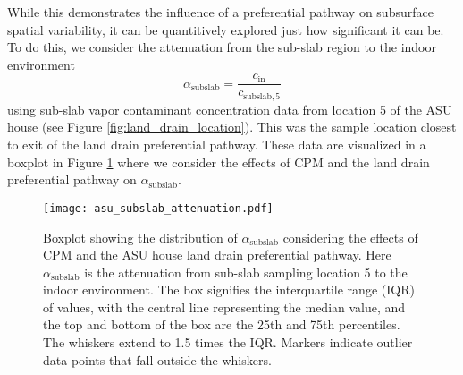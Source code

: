 While this demonstrates the influence of a preferential pathway on subsurface spatial variability, it can be quantitively explored just how significant it can be.
To do this, we consider the attenuation from the sub-slab region to the indoor environment
\begin{equation}
  \alpha_\mathrm{subslab} = \frac{c_\mathrm{in}}{c_\mathrm{subslab,5}}
\end{equation}
using sub-slab vapor contaminant concentration data from location 5 of the ASU house (see Figure \ref{fig:land_drain_location}).
This was the sample location closest to exit of the land drain preferential pathway.
These data are visualized in a boxplot in Figure \ref{fig:asu_subslab_attenuation} where we consider the effects of CPM and the land drain preferential pathway on $\alpha_\mathrm{subslab}$.\par

\begin{figure}[htb!]
  \centering
  \texttt{[image: asu\_subslab\_attenuation.pdf]}
  \caption[Boxplot showing the distribution of $\alpha_\mathrm{subslab}$ considering the effects of CPM and the ASU house land drain preferential pathway.]{Boxplot showing the distribution of $\alpha_\mathrm{subslab}$ considering the effects of CPM and the ASU house land drain preferential pathway. Here $\alpha_\mathrm{subslab}$ is the attenuation from sub-slab sampling location 5 to the indoor environment. The box signifies the interquartile range (IQR) of values, with the central line representing the median value, and the top and bottom of the box are the 25th and 75th percentiles. The whiskers extend to 1.5 times the IQR. Markers indicate outlier data points that fall outside the whiskers.}
  \label{fig:asu_subslab_attenuation}
\end{figure}

